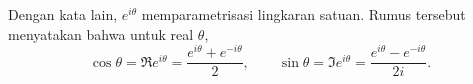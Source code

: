 
Dengan kata lain, $e^{i \theta}$ memparametrisasi lingkaran satuan.
Rumus tersebut menyatakan bahwa untuk real $\theta$,
\begin{equation*}
\cos \theta = \Re e^{i\theta} = \frac{e^{i\theta}+e^{-i\theta}}{2} ,
\qquad
\sin \theta = \Im e^{i\theta} = \frac{e^{i\theta}-e^{-i\theta}}{2i} .
\end{equation*}
